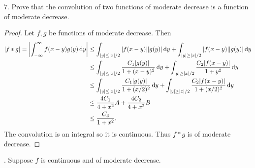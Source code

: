 \documentclass[11pt]{article}
\begin{document}
7. Prove that the convolution of two functions of moderate decrease is a function of moderate decrease.
\begin{proof}
  Let $f,g$ be functions of moderate decrease. Then \begin{align*}
    \abs{f\ast g} = \abs{\int_{-\infty}^{\infty} f(x-y)g(y)\dd{y}} &\leq \int_{\abs{y}\leq \abs{x}/2} \abs{f(x-y)}\abs{g(y)}\dd{y} + \int_{\abs{y}\geq \abs{x}/2} \abs{f(x-y)}\abs{g(y)}\dd{y}\\
    &\leq \int_{\abs{y}\leq \abs{x}/2} \frac{C_1\abs{g(y)}}{1 + (x-y)^2}\dd{y} + \int_{\abs{y}\geq \abs{x}/2} \frac{C_2\abs{f(x-y)}}{1 + y^2}\dd{y}\\
    &\leq \int_{\abs{y}\leq \abs{x}/2} \frac{C_1\abs{g(y)}}{1 + (x/2)^2}\dd{y} + \int_{\abs{y}\geq \abs{x}/2} \frac{C_2\abs{f(x-y)}}{1 + (x/2)^2}\dd{y}\\
    &\leq \frac{4C_1}{4+x^2}A + \frac{4C_2}{4+x^2}B\\
    &\leq \frac{C_3}{1+ x^2}.
  \end{align*}
  The convolution is an integral so it is continuous. Thus $f\ast g$ is of moderate decrease.
\end{proof}
. Suppose $f$ is continuous and of moderate decrease. 
\end{document}
